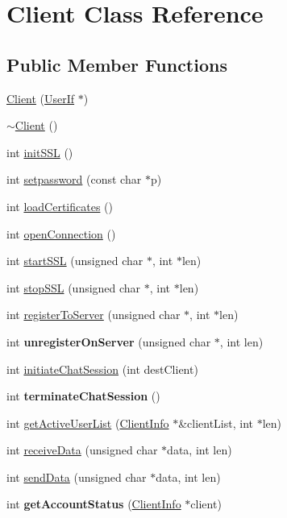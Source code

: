 \hypertarget{classClient}{
\section{Client Class Reference}
\label{classClient}
}
\subsection*{Public Member Functions}
\begin{DoxyCompactItemize}
\item 
\hyperlink{classClient_ad636af208cd43a44c112d61c88c7804b}{Client} (\hyperlink{classUserIf}{UserIf} $\ast$)
\item 
\hyperlink{classClient_a840e519ca781888cbd54181572ebe3a7}{$\sim$Client} ()
\item 
int \hyperlink{classClient_a0b3c7c10e9d82c0f5f41ee8f0d68f1b4}{initSSL} ()
\item 
int \hyperlink{classClient_aa59c27ce2d1cae55bf03d5ea64c59eef}{setpassword} (const char $\ast$p)
\item 
int \hyperlink{classClient_abcdf713583d46487081578612b5f2ae3}{loadCertificates} ()
\item 
int \hyperlink{classClient_a5bf20fbae99e62931592728e0763c9d3}{openConnection} ()
\item 
int \hyperlink{classClient_aca61b39a53eadc28d116dcae94b03e15}{startSSL} (unsigned char $\ast$, int $\ast$len)
\item 
int \hyperlink{classClient_afcd814d5ed81c40cba7e8098b887ef29}{stopSSL} (unsigned char $\ast$, int $\ast$len)
\item 
int \hyperlink{classClient_af47e3d9fab8c28ceeb709287a726660b}{registerToServer} (unsigned char $\ast$, int $\ast$len)
\item 
\hypertarget{classClient_a2a798b56462e5d51544b3e925b1aaf52}{
int {\bfseries unregisterOnServer} (unsigned char $\ast$, int len)}
\label{classClient_a2a798b56462e5d51544b3e925b1aaf52}

\item 
int \hyperlink{classClient_aca02d554e100a27ca0c2ae3b22d74f8b}{initiateChatSession} (int destClient)
\item 
\hypertarget{classClient_a98f7e1439a0c01db787d35d847b4d985}{
int {\bfseries terminateChatSession} ()}
\label{classClient_a98f7e1439a0c01db787d35d847b4d985}

\item 
int \hyperlink{classClient_a63b70c823acca41db31b07630814b8b6}{getActiveUserList} (\hyperlink{structClientInfo}{ClientInfo} $\ast$\&clientList, int $\ast$len)
\item 
int \hyperlink{classClient_a4a755fe461f77825b30a7a00c1cd9b5c}{receiveData} (unsigned char $\ast$data, int len)
\item 
int \hyperlink{classClient_a851cbb91211093de7983127c68eab263}{sendData} (unsigned char $\ast$data, int len)
\item 
\hypertarget{classClient_a61aa57e85f362501329e9164ddf4bdc9}{
int {\bfseries getAccountStatus} (\hyperlink{structClientInfo}{ClientInfo} $\ast$client)}
\label{classClient_a61aa57e85f362501329e9164ddf4bdc9}


\end{DoxyCompactItemize}
